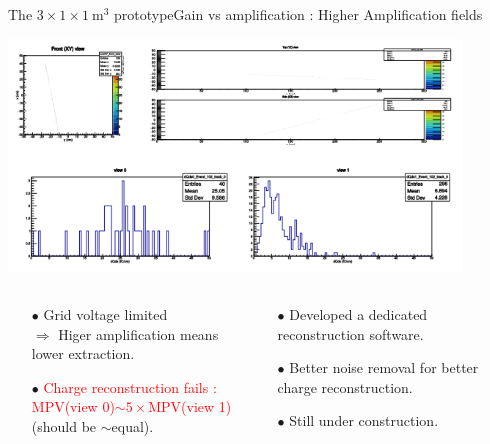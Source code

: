 \documentclass[10pt]{beamer}
\begin{document}
    \begin{frame}{The \texorpdfstring{$3 \times 1 \times \SI{1}{\meter\cubed}$}{311} prototype}{Gain vs amplification : Higher Amplification fields}
    	\begin{scriptsize}
    		\centering
    		\includegraphics[width=0.9\textwidth]{figures/311/bad_track.png}\\
    		\vfill
    		\begin{columns}
    			\begin{column}{0.5\textwidth}
    				\begin{itemize}
    					\item[$\bullet$] Grid voltage limited\\ $\Rightarrow$ Higer amplification means lower extraction.
    					\item[$\bullet$] \textcolor{red}{Charge reconstruction fails : \\MPV(view 0)$\sim5\times$MPV(view 1)}\\(should be $\sim$equal).
    				\end{itemize}
    			\end{column}
    			\hfill
    			\begin{column}{0.5\textwidth}
    				\begin{itemize}
    					\item[$\bullet$] Developed a dedicated reconstruction software.
    					\item[$\bullet$] Better noise removal for better charge reconstruction.
    					\item[$\bullet$] Still under construction.
    				\end{itemize}
    			\end{column}
    		\end{columns}
    	\end{scriptsize}
    \end{frame}
    
\end{document}
